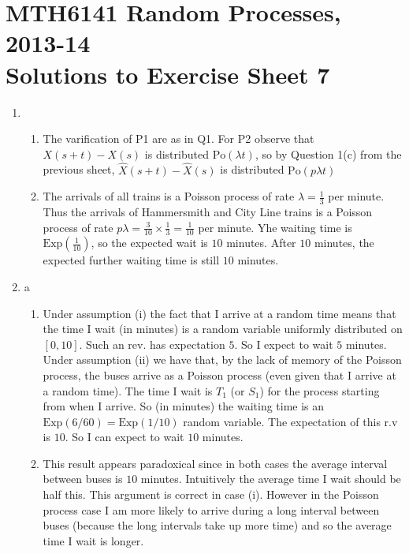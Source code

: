 \documentclass[11pt,a4paper]{article}
\begin{document}
    \section*{MTH6141 Random Processes, 2013-14\\Solutions to Exercise Sheet 7}
    \begin{enumerate}
        \item
        \begin{enumerate}
            \item The varification of P1 are as in Q1. For P2 observe that $X(s+t)-X(s)$ is distributed $\text{Po}(\lambda t)$, so by Question 1(c) from the previous sheet, $\widehat{X}(s+t)-\widehat{X}(s)$ is distributed $\text{Po}(p\lambda t)$ 
            \item The arrivals of all trains is a Poisson process of rate $\lambda = \frac{1}{3}$ per minute. Thus the arrivals of Hammersmith and City Line trains is a Poisson process of rate $p\lambda = \frac{3}{10}\times \frac{1}{3} = \frac{1}{10}$ per minute. Yhe waiting time is $\text{Exp}(\frac{1}{10})$, so the expected wait is $10$ minutes. After $10$ minutes, the expected further waiting time is still $10$ minutes.
        \end{enumerate}
        \item a
        \begin{enumerate}
            \item Under assumption (i) the fact that I arrive at a random time means that the time I wait (in minutes) is a random variable uniformly distributed on $[0, 10]$. Such an rev. has expectation $5$. So I expect to wait $5$ minutes. Under assumption (ii) we have that, by the lack of memory of the Poisson process, the buses arrive as a Poisson process (even given that I arrive at a random time). The time I wait is $T_1$ (or $S_1$) for the process starting from when I arrive. So (in minutes) the waiting time is an $\text{Exp}(6/60) = \text{Exp}(1/10)$ random variable. The expectation of this r.v is $10$. So I can expect to wait $10$ minutes.
            \item This result appears paradoxical since in both cases the average interval between buses is $10$ minutes. Intuitively the average time I wait should be half this. This argument is correct in case (i). However in the Poisson process case I am more likely to arrive during a long interval between buses (because the long intervals take up more time) and so the average time I wait is longer.
        \end{enumerate}

\end{enumerate}
\end{document}
